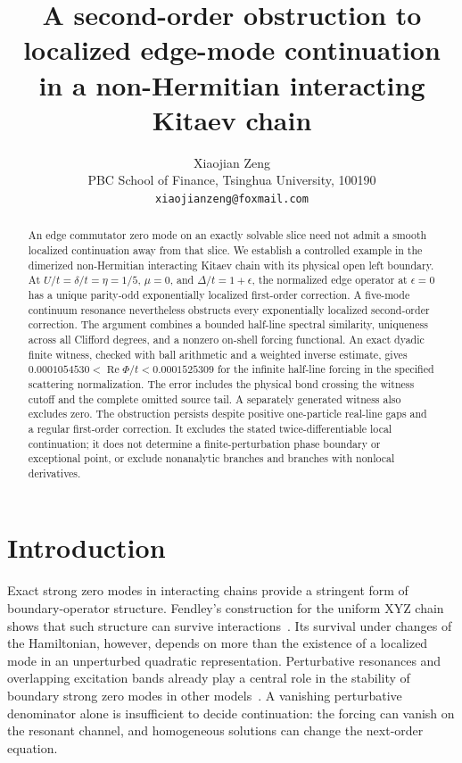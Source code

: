 \documentclass[11pt,a4paper]{article}
\title{A second-order obstruction to localized edge-mode continuation\newline
in a non-Hermitian interacting Kitaev chain}
\author{Xiaojian Zeng\\[3pt]
\small PBC School of Finance, Tsinghua University, 100190\\
\small\texttt{xiaojianzeng@foxmail.com}}
\date{}
\newcommand{\Rea}{\operatorname{Re}}
\begin{document}
\maketitle
\begin{abstract}
An edge commutator zero mode on an exactly solvable slice need not admit a smooth
localized continuation away from that slice. We establish a controlled example
in the dimerized non-Hermitian interacting Kitaev chain with its physical open
left boundary. At $U/t=\delta/t=\eta=1/5$, $\mu=0$, and
$\Delta/t=1+\epsilon$, the normalized edge operator at $\epsilon=0$ has a
unique parity-odd exponentially localized first-order correction. A
five-mode continuum resonance nevertheless obstructs every exponentially
localized second-order correction. The argument combines a bounded
half-line spectral similarity, uniqueness across all Clifford degrees, and
a nonzero on-shell forcing functional. An exact dyadic finite witness,
checked with ball arithmetic and a weighted inverse estimate, gives
$0.0001054530<\Rea\Phi/t<0.0001525309$ for the infinite half-line
forcing in the specified scattering normalization. The error includes the
physical bond crossing the witness cutoff and the complete omitted source
tail. A separately generated witness also excludes zero. The obstruction
persists despite positive one-particle real-line gaps and a regular first-order
correction. It excludes the stated twice-differentiable local continuation;
it does not determine a finite-perturbation phase boundary or exceptional point,
or exclude nonanalytic branches and branches with nonlocal derivatives.
\end{abstract}

\section{Introduction}
Exact strong zero modes in interacting chains provide a stringent form of
boundary-operator structure. Fendley's construction for the uniform XYZ chain
shows that such structure can survive interactions~\cite{Fendley2016}. Its
survival under changes of the Hamiltonian, however, depends on more than the
existence of a localized mode in an unperturbed quadratic representation.
Perturbative resonances and overlapping excitation bands already play a
central role in the stability of boundary strong zero modes in other
models~\cite{Olund2025}. A vanishing perturbative denominator alone is
insufficient to decide continuation: the forcing can vanish on the resonant
channel, and homogeneous solutions can change the next-order equation.
\end{document}
